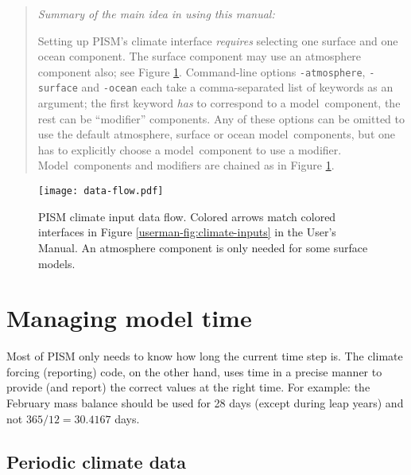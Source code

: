 \documentclass[titlepage,letterpaper,final]{scrartcl}
\begin{document}
\vspace{0.3in}

\begin{quote}
\begin{center}
\emph{Summary of the main idea in using this manual:}
\end{center}

Setting up PISM's climate interface \emph{requires} selecting one surface and one
ocean component. The surface component may use an atmosphere component also;
see Figure \ref{fig:climate-input-data-flow}. Command-line options
\texttt{-atmosphere}, \texttt{-surface} and \texttt{-ocean} each take a
comma-separated list of keywords as an argument; the first keyword \emph{has}
to correspond to a model~component, the rest can be ``modifier'' components.
Any of these options can be omitted to use the default atmosphere, surface or
ocean model~components, but one has to explicitly choose a model~component
to use a modifier. Model~components and modifiers are chained as in Figure
\ref{fig:climate-input-data-flow}.
\end{quote}

\begin{figure}
  \centering
  \texttt{[image: data-flow.pdf]}
  \caption{PISM climate input data flow.  Colored arrows match colored interfaces in
    Figure \ref*{userman-fig:climate-inputs} in the User's Manual.  An atmosphere component is only needed for some surface models.}
  \label{fig:climate-input-data-flow}
\end{figure}


\newpage
\section{Managing model time}
\label{sec:model-time}

Most of PISM only needs to know how long the current time step is. The
climate forcing (reporting) code, on the other hand, uses time in a
precise manner to provide (and report) the correct values at the right
time. For example: the February mass balance should be used for 28
days (except during leap years) and not $365/12 = 30.4167$ days.




\subsection{Periodic climate data}
\label{sec:periodic-forcing}
\end{document}

